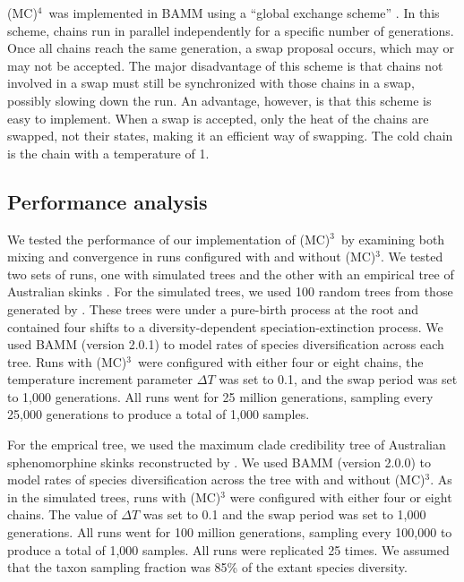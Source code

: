 \documentclass[12pt]{article}
\newcommand{\MCMCMC}{(MC)$^{3}$}
\newcommand{\MCMCMCMC}{(MC)$^{4}$}
\begin{document}
\MCMCMCMC\ was implemented in BAMM
using a ``global exchange scheme'' \citep{alt04}.
%
In this scheme, chains run in parallel independently
for a specific number of generations.
%
Once all chains reach the same generation, a swap proposal occurs,
which may or may not be accepted.
%
The major disadvantage of this scheme
is that chains not involved in a swap
must still be synchronized with those chains in a swap,
possibly slowing down the run.
%
An advantage, however, is that this scheme is easy to implement.
%
When a swap is accepted, only the heat of the chains are swapped,
not their states, making it an efficient way of swapping.
%
The cold chain is the chain with a temperature of 1.


\subsection*{Performance analysis}

We tested the performance of our implementation of \MCMCMC\ 
by examining both mixing and convergence in runs
configured with and without \MCMCMC.
%
We tested two sets of runs, one with simulated trees
and the other with an empirical tree of Australian skinks \citep{rab14sysbio}.
%
For the simulated trees, we used 100 random trees
from those generated by \citet{rab14plos}.
%
These trees were under a pure-birth process at the root and
contained four shifts to a diversity-dependent speciation-extinction process.
%
We used BAMM (version 2.0.1) to model rates of species diversification
across each tree.
%
Runs with \MCMCMC\ were configured with either four or eight chains,
the temperature increment parameter $\Delta T$ was set to 0.1,
and the swap period was set to 1,000 generations.
%
All runs went for 25 million generations,
sampling every 25,000 generations to produce a total of 1,000 samples.


For the emprical tree, we used the maximum clade credibility tree
of Australian sphenomorphine skinks reconstructed by \citet{rab14sysbio}.
%
We used BAMM (version 2.0.0) to model rates of species diversification
across the tree with and without \MCMCMC.
%
As in the simulated trees, runs with \MCMCMC
were configured with either four or eight chains.
%
The value of $\Delta T$ was set to 0.1
and the swap period was set to 1,000 generations.
%
All runs went for 100 million generations,
sampling every 100,000 to produce a total of 1,000 samples.
%
All runs were replicated 25 times.
%
We assumed that the taxon sampling fraction was 85\%
of the extant species diversity.
\end{document}
